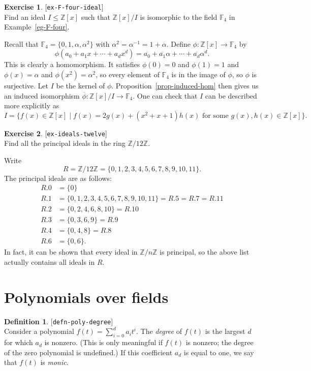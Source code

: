 \documentclass{amsart}
\newcommand{\lbl}[1]{\label{#1}\textup{[\texttt{#1}]}\ \\}
\newcommand{\lbl}{\label}
\newcommand{\Z}         {{\mathbb{Z}}}
\newcommand{\F}         {{\mathbb{F}}}
\newcommand{\al}        {\alpha}
\newcommand{\ov}[1]     {\overline{#1}}
\newcommand{\st}        {\;|\;}
\renewcommand{\:}{\colon}
\newcommand{\lastexlabel}{}
\newcommand{\exlabel}[1]{
 \global\def\lastexlabel{#1}\label{#1}[\texttt{#1}]\ \\
}
\newcommand{\exlabel}[1]{
 \global\def\lastexlabel{#1}\label{#1}
}
\newenvironment{solution}{\SolutionInline}{\endSolutionInline}
\theoremstyle{definition}
\newtheorem{definition}[theorem]{Definition}
\newtheorem{exercise}{Exercise}[section]
\renewenvironment{solution}{\SolutionAtEnd}{\endSolutionAtEnd}
\begin{document}
\begin{exercise}\exlabel{ex-F-four-ideal}
 Find an ideal $I\leq\Z[x]$ such that $\Z[x]/I$ is isomorphic to the
 field $\F_4$ in Example~\ref{eg-F-four}.
\end{exercise}
\begin{solution}
 Recall that $\F_4=\{0,1,\al,\al^2\}$ with $\al^2=\al^{-1}=1+\al$.
 Define $\phi\:\Z[x]\to\F_4$ by 
 \[ \phi(a_0+a_1x+\dotsb+a_dx^d) = 
     \ov{a_0}+\ov{a_1}\al+\dotsb+\ov{a_d}\al^d.
 \]
 This is clearly a homomorphism.  It satisfies $\phi(0)=0$ and
 $\phi(1)=1$ and $\phi(x)=\al$ and $\phi(x^2)=\al^2$, so every element
 of $\F_4$ is in the image of $\phi$, so $\phi$ is surjective.  Let
 $I$ be the kernel of $\phi$.  Proposition~\ref{prop-induced-hom} then
 gives us an induced isomorphism $\ov{\phi}\:\Z[x]/I\to\F_4$.  One can
 check that $I$ can be described more explicitly as 
 \[ I = \{f(x)\in\Z[x]\st f(x)=2g(x)+(x^2+x+1)h(x)
           \text{ for some } g(x),h(x)\in\Z[x]\}.
 \]
\end{solution}
\begin{exercise}\exlabel{ex-ideals-twelve}
 Find all the principal ideals in the ring $\Z/12\Z$.
\end{exercise}
\begin{solution}
 Write 
 \[ R=\Z/12\Z=\{0,1,2,3,4,5,6,7,8,9,10,11\}. \]
 The principal ideals are as follows:
 \begin{align*}
  R.0 &= \{0\} \\
  R.1 &= \{0,1,2,3,4,5,6,7,8,9,10,11\} = R.5 = R.7 = R.11 \\
  R.2 &= \{0,2,4,6,8,10\} = R.10 \\
  R.3 &= \{0,3,6,9\} = R.9 \\
  R.4 &= \{0,4,8\} = R.8 \\
  R.6 &= \{0,6\}.
 \end{align*}
 In fact, it can be shown that every ideal in $\Z/n\Z$ is principal,
 so the above list actually contains all ideals in $R$.
\end{solution}

\section{Polynomials over fields}
\label{sec-poly}

\begin{definition}\lbl{defn-poly-degree}
 Consider a polynomial $f(t)=\sum_{i=0}^da_it^i$.  The \emph{degree}
 of $f(t)$ is the largest $d$ for which $a_d$ is nonzero.  (This is
 only meaningful if $f(t)$ is nonzero; the degree of the zero
 polynomial is undefined.)  If this coefficient $a_d$ is equal to one,
 we say that $f(t)$ is \emph{monic}.
\end{definition}
\end{document}
